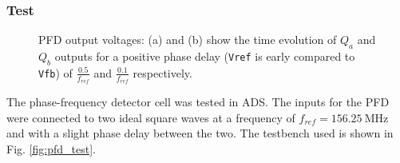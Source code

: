 \documentclass[lettersize,journal]{IEEEtran}
\begin{document}
\subsubsection{Test}

\begin{figure}[!ht]
    \centering
    \hfil
    \hfil
    \caption{PFD output voltages: (a) and (b) show the time evolution of \(Q_a\) and \(Q_b\) outputs for a positive phase delay (\texttt{Vref} is early compared to \texttt{Vfb}) of $\frac{0.5}{f_{ref}}$ and $\frac{0.1}{f_{ref}}$ respectively.} 
    \label{fig:pfd_test_waveforms}
\end{figure}

The phase-frequency detector cell was tested in ADS. The inputs for the PFD were connected to two ideal square waves at a frequency of $f_{ref}=\SI{156.25}{\mega\hertz}$ and with a slight phase delay between the two. The testbench used is shown in Fig. \ref{fig:pfd_test}.
\end{document}
